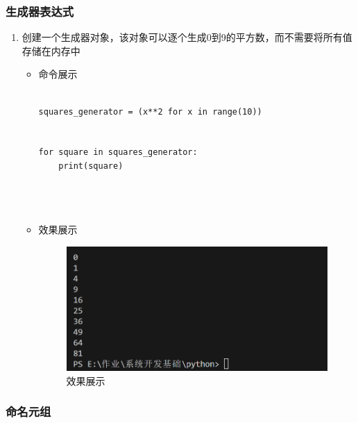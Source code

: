 \documentclass[UTF8]{ctexart}
\begin{document}
\subsubsection{生成器表达式 }

\begin{enumerate}
  \item 创建一个生成器对象，该对象可以逐个生成0到9的平方数，而不需要将所有值存储在内存中
  \begin{itemize}
  \item 命令展示
  \begin{verbatim}

squares_generator = (x**2 for x in range(10))


for square in squares_generator:
    print(square)


    
  \end{verbatim}

  \item 效果展示
  \begin{figure}[H]
    \centering
    \includegraphics[width=\textwidth]{2113} %
    \caption{效果展示}
  
  \end{figure}
\end{itemize}
\end{enumerate}





\subsubsection{命名元组}
\end{document}
